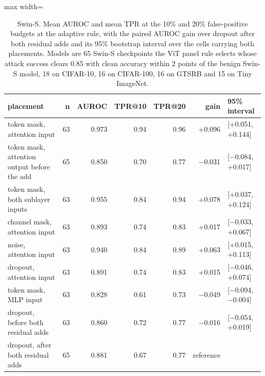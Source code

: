 \begin{table}[htbp]
\centering
\small
\caption{Swin-S. Mean AUROC and mean TPR at the 10\% and 20\% false-positive budgets at the adaptive rule, with the paired AUROC gain over dropout after both residual adds and its 95\% bootstrap interval over the cells carrying both placements. Models are 65 Swin-S checkpoints the ViT panel rule selects whose attack success clears 0.85 with clean accuracy within 2 points of the benign Swin-S model, 18 on CIFAR-10, 16 on CIFAR-100, 16 on GTSRB and 15 on Tiny ImageNet.}
\label{tab:swin-main}
\begin{adjustbox}{max width=\textwidth}
\begin{tabular}{lrrrrrl}
\toprule
placement & n & AUROC & TPR@10 & TPR@20 & gain & 95\% interval \\
\midrule
token mask, attention input & 63 & 0.973 & 0.94 & 0.96 & +0.096 & [+0.051, +0.144] \\
token mask, attention output before the add & 65 & 0.850 & 0.70 & 0.77 & $-$0.031 & [$-$0.084, +0.017] \\
token mask, both sublayer inputs & 63 & 0.955 & 0.84 & 0.94 & +0.078 & [+0.037, +0.124] \\
channel mask, attention input & 63 & 0.893 & 0.74 & 0.83 & +0.017 & [$-$0.033, +0.067] \\
noise, attention input & 63 & 0.940 & 0.84 & 0.89 & +0.063 & [+0.015, +0.113] \\
dropout, attention input & 63 & 0.891 & 0.74 & 0.83 & +0.015 & [$-$0.046, +0.074] \\
token mask, MLP input & 63 & 0.828 & 0.61 & 0.73 & $-$0.049 & [$-$0.094, $-$0.004] \\
dropout, before both residual adds & 63 & 0.860 & 0.72 & 0.77 & $-$0.016 & [$-$0.054, +0.019] \\
dropout, after both residual adds & 65 & 0.881 & 0.67 & 0.77 & reference &  \\
\bottomrule
\end{tabular}
\end{adjustbox}
\end{table}
